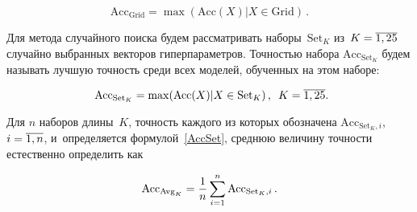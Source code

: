 \begin{multicols}{2}
\noindent
\begin{equation}
\label{AccGrid}
\mathrm{Acc_{Grid}}=\max(\mathrm{Acc}(X)|X\in \mathrm{Grid})\,.
\end{equation}

\vspace*{-2pt}

Для метода случайного поиска будем рас\-смат\-ри\-вать наборы~$\mathrm{Set}_K$ 
из~$K\hm=\overline{1,25}$  случайно выбранных векторов гиперпараметров. 
Точностью набора $\mathrm{Acc}_{\mathrm{Set}_K}$ будем называть лучшую точность 
среди всех моделей, обученных на этом наборе:

\vspace*{2pt}

\noindent
\begin{equation}
\label{AccSet}
\mathrm{Acc}_{\mathrm{Set}_K}=\max(\mathrm{Acc}(X)|X\in \mathrm{Set}_K)\,, 
\enskip K=\overline{1,25}.\!\!
\end{equation}

\vspace*{-2pt}

Для $n$ наборов длины~$K$, точность каждого из которых обозначена $\mathrm{Acc}_{\mathrm{Set}_K,i}$, 
$i\hm=\overline{1,n}$, и~определяется формулой~\eqref{AccSet}, 
среднюю величину точности естественно определить как

\vspace*{2pt}

\noindent
\begin{equation}
\label{AccAvg}
\mathrm{Acc}_{\mathrm{Avg}_K} = \displaystyle\frac{\displaystyle 1\mathstrut}{\displaystyle n\mathstrut}\sum\limits_{i=1}^{n} 
\mathrm{Acc}_{\mathrm{Set}_K,i}\,.
\end{equation}

\vspace*{-2pt}

\begin{table*}\small %
\begin{center}
\label{Tab1}
\vspace*{2ex}



\end{center}
\end{table*}
\end{multicols}
